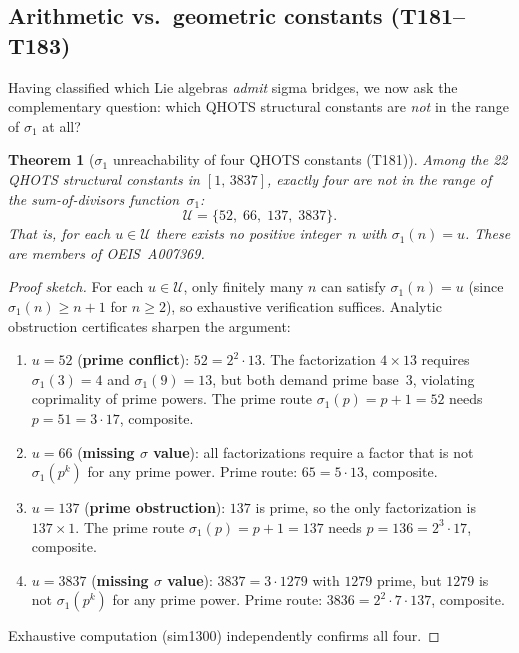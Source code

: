 \documentclass[aps,prd,twocolumn,superscriptaddress,floatfix,nofootinbib]{revtex4-2}
\newtheorem{theorem}{Theorem}
\theoremstyle{definition}
\theoremstyle{remark}
\begin{document}
\subsection{Arithmetic vs.\ geometric constants (T181--T183)}
\label{sec:sigma-unreachability}

Having classified which Lie algebras \emph{admit} sigma bridges, we now
ask the complementary question: which QHOTS structural constants are
\emph{not} in the range of $\sigma_1$ at all?

\begin{theorem}[$\sigma_1$ unreachability of four QHOTS constants (T181)]
\label{thm:sigma-unreachable}
Among the 22 QHOTS structural constants in $[1,\,3837]$, exactly four
are not in the range of the sum-of-divisors function~$\sigma_1$:
\[
  \mathcal{U} = \{52,\; 66,\; 137,\; 3837\}.
\]
That is, for each $u \in \mathcal{U}$ there exists no positive integer~$n$
with $\sigma_1(n) = u$.  These are members of OEIS~A007369.
\end{theorem}

\begin{proof}[Proof sketch]
For each $u \in \mathcal{U}$, only finitely many $n$ can satisfy
$\sigma_1(n) = u$ (since $\sigma_1(n) \ge n{+}1$ for $n \ge 2$), so
exhaustive verification suffices.  Analytic obstruction certificates
sharpen the argument:
\begin{enumerate}[nosep]
  \item $u = 52$ (\textbf{prime conflict}): $52 = 2^2 \cdot 13$.
    The factorization $4 \times 13$ requires
    $\sigma_1(3) = 4$ and $\sigma_1(9) = 13$, but both demand prime
    base~$3$, violating coprimality of prime powers.
    The prime route $\sigma_1(p) = p{+}1 = 52$ needs $p = 51 = 3
    \cdot 17$, composite.
  \item $u = 66$ (\textbf{missing $\sigma$ value}):
    all factorizations require a factor that is not
    $\sigma_1(p^k)$ for any prime power.  Prime route: $65 = 5 \cdot
    13$, composite.
  \item $u = 137$ (\textbf{prime obstruction}): $137$ is prime, so the
    only factorization is $137 \times 1$.  The prime route
    $\sigma_1(p) = p{+}1 = 137$ needs $p = 136 = 2^3 \cdot 17$, composite.
  \item $u = 3837$ (\textbf{missing $\sigma$ value}):
    $3837 = 3 \cdot 1279$ with $1279$ prime, but $1279$ is not
    $\sigma_1(p^k)$ for any prime power.  Prime route: $3836 = 2^2
    \cdot 7 \cdot 137$, composite.
\end{enumerate}
Exhaustive computation (sim1300) independently confirms all four.
\end{proof}
\end{document}
